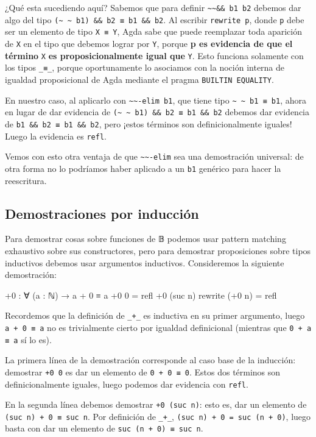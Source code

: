 \documentclass[11pt]{article} %
\begin{document}
¿Qué esta sucediendo aquí? Sabemos que para definir \verb|~~&& b1 b2| debemos dar algo del tipo \verb|(~ ~ b1) && b2 ≡ b1 && b2|. Al escribir \verb|rewrite p|, donde \verb|p| debe ser un elemento de tipo \verb|X ≡ Y|, Agda sabe que puede reemplazar toda aparición de \verb|X| en el tipo que debemos lograr por \verb|Y|, porque \textbf{p es evidencia de que el término} \verb|X| \textbf{es proposicionalmente igual que} \verb|Y|. Esto funciona solamente con los tipos \verb|_≡_|, porque oportunamente lo asociamos con la noción interna de igualdad proposicional de Agda mediante el pragma \verb|BUILTIN EQUALITY|. 

En nuestro caso, al aplicarlo con \verb|~~-elim b1|, que tiene tipo \verb|~ ~ b1 ≡ b1|, ahora en lugar de dar evidencia de \verb|(~ ~ b1) && b2 ≡ b1 && b2| debemos dar evidencia de \verb|b1 && b2 ≡ b1 && b2|, pero ¡estos términos son definicionalmente iguales! Luego la evidencia es \verb|refl|. 

Vemos con esto otra ventaja de que \verb|~~-elim| sea una demostración universal: de otra forma no lo podríamos haber aplicado a un \verb|b1| genérico para hacer la reescritura.

\subsection{Demostraciones por inducción}
Para demostrar cosas sobre funciones de 𝔹 podemos usar pattern matching exhaustivo sobre sus constructores, pero para demostrar proposiciones sobre tipos inductivos debemos usar argumentos inductivos. Consideremos la siguiente demostración:

\begin{code}
+0 : ∀ (a : ℕ) → a + 0 ≡ a
+0 0 = refl
+0 (suc n) rewrite (+0 n) = refl
\end{code}

Recordemos que la definición de \verb|_+_| es inductiva en su primer argumento, luego \verb|a + 0 ≡ a| no es trivialmente cierto por igualdad definicional (mientras que \verb|0 + a ≡ a| sí lo es).

La primera línea de la demostración corresponde al caso base de la inducción: demostrar \verb|+0 0| es dar un elemento de \verb|0 + 0 ≡ 0|. Estos dos términos son definicionalmente iguales, luego podemos dar evidencia con \verb|refl|.

En la segunda línea debemos demostrar \verb|+0 (suc n)|: esto es, dar un elemento de \verb|(suc n) + 0 ≡ suc n|. Por definición de \verb|_+_|, \verb|(suc n) + 0 = suc (n + 0)|, luego basta con dar un elemento de \verb|suc (n + 0) ≡ suc n|. 
\end{document}
